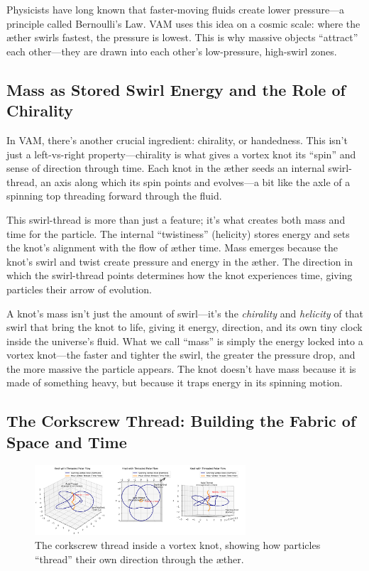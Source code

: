 Physicists have long known that faster-moving fluids create lower pressure—a principle called Bernoulli’s Law. VAM uses this idea on a cosmic scale: where the æther swirls fastest, the pressure is lowest. This is why massive objects “attract” each other—they are drawn into each other’s low-pressure, high-swirl zones.


\subsection*{Mass as Stored Swirl Energy and the Role of Chirality}

In VAM, there’s another crucial ingredient: chirality, or handedness. This isn’t just a left-vs-right property—chirality is what gives a vortex knot its “spin” and sense of direction through time. Each knot in the æther seeds an internal swirl-thread, an axis along which its spin points and evolves—a bit like the axle of a spinning top threading forward through the fluid.


This swirl-thread is more than just a feature; it’s what creates both mass and time for the particle. The internal “twistiness” (helicity) stores energy and sets the knot’s alignment with the flow of æther time. Mass emerges because the knot’s swirl and twist create pressure and energy in the æther. The direction in which the swirl-thread points determines how the knot experiences time, giving particles their arrow of evolution.


A knot’s mass isn’t just the amount of swirl—it’s the \textit{chirality} and \textit{helicity} of that swirl that bring the knot to life, giving it energy, direction, and its own tiny clock inside the universe’s fluid. What we call “mass” is simply the energy locked into a vortex knot—the faster and tighter the swirl, the greater the pressure drop, and the more massive the particle appears. The knot doesn’t have mass because it is made of something heavy, but because it traps energy in its spinning motion.


\subsection*{The Corkscrew Thread: Building the Fabric of Space and Time}
\begin{figure}[H]
    \centering
    \includegraphics[width=0.7\textwidth]{KnotThreadedPolarFlow}
    \caption{The corkscrew thread inside a vortex knot, showing how particles “thread” their own direction through the æther.}
\end{figure}

